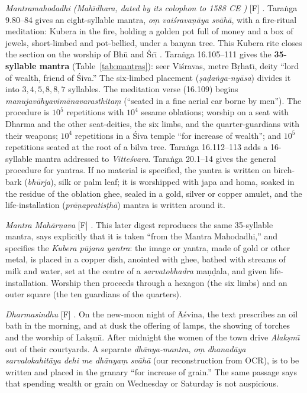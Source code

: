 \documentclass[pdflatex,sn-basic]{sn-jnl}
\theoremstyle{thmstyleone}
\theoremstyle{thmstylethree}
\newcommand{\Fact}{\textsf{[F]}}
\begin{document}
\emph{Mantramahodadhi (Mah\=\i dhara, dated by its colophon to 1588 CE \citep{buhnemann2000})} \Fact{} \citep{mm1988trans,buhnemann2000}. Tara\.nga 9.80--84 gives an eight-syllable mantra, \emph{o\d m vai\'srava\d n\=aya sv\=ah\=a}, with a fire-ritual meditation: Kubera in the fire, holding a golden pot full of money and a box of jewels, short-limbed and pot-bellied, under a banyan tree. This Kubera rite closes the section on the worship of Bh\=u and \'Sr\=\i{} \citep{buhnemann2000}. Tara\.nga 16.105--111 gives the \textbf{35-syllable mantra} (Table~\ref{tab:mantras}): seer Vi\'sravas, metre B\d rhat\=\i, deity ``lord of wealth, friend of \'Siva.'' The six-limbed placement (\emph{\d sa\d da\.nga-ny\=asa}) divides it into $3,4,5,8,8,7$ syllables. The meditation verse (16.109) begins \emph{manujav\=ahyavim\=anavarasthita\d m} (``seated in a fine aerial car borne by men''). The procedure is $10^5$ repetitions with $10^4$ sesame oblations; worship on a seat with Dharma and the other seat-deities, the six limbs, and the quarter-guardians with their weapons; $10^4$ repetitions in a \'Siva temple ``for increase of wealth''; and $10^5$ repetitions seated at the root of a bilva tree. Tara\.nga 16.112--113 adds a 16-syllable mantra addressed to \emph{Vitte\'svara}. Tara\.nga 20.1--14 gives the general procedure for yantras. If no material is specified, the yantra is written on birch-bark (\emph{bh\=urja}), silk or palm leaf; it is worshipped with japa and homa, soaked in the residue of the oblation ghee, sealed in a gold, silver or copper amulet, and the life-installation (\emph{pr\=a\d napratis\d th\=a}) mantra is written around it.

\emph{Mantra Mah\=ar\d nava} \Fact{} \citep{mantramaharnava}. This later digest reproduces the same 35-syllable mantra, says explicitly that it is taken ``from the Mantra Mahodadhi,'' and specifies the \emph{Kubera p\=ujana yantra}: the image or yantra, made of gold or other metal, is placed in a copper dish, anointed with ghee, bathed with streams of milk and water, set at the centre of a \emph{sarvatobhadra} ma\d n\d dala, and given life-installation. Worship then proceeds through a hexagon (the six limbs) and an outer square (the ten guardians of the quarters).

\emph{Dharmasindhu} \Fact{} \citep{dharmasindhu1907}. On the new-moon night of \=A\'svina, the text prescribes an oil bath in the morning, and at dusk the offering of lamps, the showing of torches and the worship of Lak\d sm\=\i{}. After midnight the women of the town drive \emph{Alak\d sm\=\i} out of their courtyards. A separate \emph{dh\=anya-mantra}, \emph{o\d m dhanad\=aya sarvalokahit\=aya dehi me dh\=anya\d m sv\=ah\=a} (our reconstruction from OCR), is to be written and placed in the granary ``for increase of grain.'' The same passage says that spending wealth or grain on Wednesday or Saturday is not auspicious.
\end{document}
